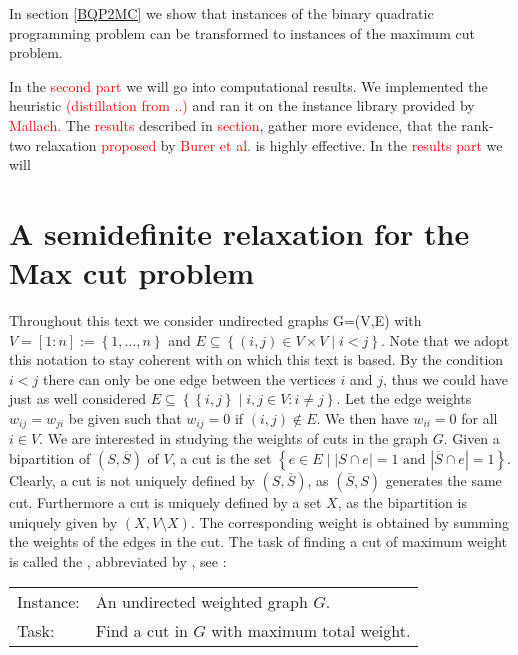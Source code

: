 \documentclass[12pt,a4paper]{article}
\theoremstyle{mythm}
\begin{document}
In section \ref{BQP2MC} we show that instances of the binary quadratic programming problem can be transformed to instances of the maximum cut problem.

In the \textcolor{red}{second part} we will go into computational results.
We implemented the heuristic \textcolor{red}{(distillation from ..)} and ran it on the instance library provided by \textcolor{red}{Mallach.}
The \textcolor{red}{results} described in \textcolor{red}{section}, gather more evidence, that the rank-two relaxation \textcolor{red}{proposed } by \textcolor{red}{Burer et
al.} is highly effective.
In the \textcolor{red}{results part} we will 
\newpage

\section{A semidefinite relaxation for the Max cut problem} 
\label{sec:GoemansWilliamson} 
Throughout this text we consider undirected graphs G=(V,E) with $ V = \left[ 1:n \right] := \left\{ 1, \dots , n \right\} $ and $ E \subseteq \left\{ \left( i,j \right)  \in V \times V \mid i<j \right\} $.
Note that we adopt this notation to stay coherent with \cite{Burer2002} on which this text is based.
By the condition $ i < j $ there can only be one edge between the vertices $ i $ and $ j $, thus we could have just as well considered $ E \subseteq \left\{ \left\{ i,j
\right\}  \mid i,j \in V: i \neq j  \right\} $.
Let the edge weights $ w _{ ij } = w _{ ji }  $ be given such that $ w _{ ij } = 0 $ if $ \left( i,j \right) \notin E $. We then have $ w _{ ii } = 0 $ for all $ i \in V $.
We are interested in studying the weights of cuts in the graph $ G $.
Given a bipartition of $ \left( S , \overline{ S }  \right)  $ of $ V $, a cut is the set $ \left\{ e \in E \mid \left| S \cap e \right| = 1 \text{ and } \left| \overline{ S }
\cap e \right| = 1  \right\}  $. Clearly, a cut is not uniquely defined by $ \left( S , \overline{ S }  \right)  $, as $ \left( \overline{ S } , S \right)  $ generates the
same cut. 
Furthermore a cut is uniquely defined by a set $ X $, as the bipartition is uniquely given by $ \left( X, V \setminus X \right)  $.
The corresponding weight is obtained by summing the weights of the edges in the cut.
The task of finding a cut of maximum weight is called the \mcp , abbreviated by \MCP, see \cite{Korte2018}:
\begin{mdframed}[frametitle= {Maximum Weight Cut Problem}]
\begin{tabular}{ll}
Instance: &An undirected weighted graph $ G $. \\
Task: &Find a cut in $ G $ with maximum total weight.
\end{tabular}
\end{mdframed}
\end{document}
